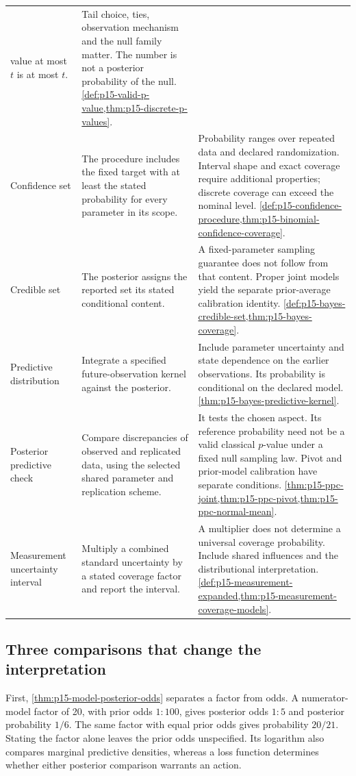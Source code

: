 \begin{longtable}{@{}p{}p{}p{}@{}}
value at most \(t\) is at most \(t\). & Tail choice, ties, observation
mechanism and the null family matter. The number is not a posterior
probability of the null. \cref{def:p15-valid-p-value,thm:p15-discrete-p-values}. \\
Confidence set & The procedure includes the fixed target with at least the
stated probability for every parameter in its scope. & Probability ranges
over repeated data and declared randomization. Interval shape and exact
coverage require additional properties; discrete coverage can exceed the
nominal level.
\cref{def:p15-confidence-procedure,thm:p15-binomial-confidence-coverage}. \\
Credible set & The posterior assigns the reported set its stated conditional
content. & A fixed-parameter sampling guarantee does not follow from that
content. Proper joint models yield the separate prior-average calibration
identity. \cref{def:p15-bayes-credible-set,thm:p15-bayes-coverage}. \\
Predictive distribution & Integrate a specified future-observation kernel
against the posterior. & Include parameter uncertainty and state dependence
on the earlier observations. Its probability is conditional on the declared
model. \cref{thm:p15-bayes-predictive-kernel}. \\
Posterior predictive check & Compare discrepancies of observed and replicated
data, using the selected shared parameter and replication scheme. & It tests
the chosen aspect. Its reference probability need not be a valid classical
\(p\)-value under a fixed null sampling law. Pivot and prior-model
calibration have separate conditions.
\cref{thm:p15-ppc-joint,thm:p15-ppc-pivot,thm:p15-ppc-normal-mean}. \\
Measurement uncertainty interval & Multiply a combined standard uncertainty
by a stated coverage factor and report the interval. & A multiplier does
not determine a universal coverage probability. Include shared influences
and the distributional interpretation.
\cref{def:p15-measurement-expanded,thm:p15-measurement-coverage-models}. \\
\bottomrule
\end{longtable}

\subsection{Three comparisons that change the interpretation}

First, \cref{thm:p15-model-posterior-odds} separates a factor from odds.
A numerator-model factor of 20, with prior odds \(1:100\), gives posterior
odds \(1:5\) and posterior probability \(1/6\). The same factor with
equal prior odds gives probability \(20/21\). Stating the factor alone
leaves the prior odds unspecified. Its logarithm also compares marginal
predictive densities, whereas a loss function determines whether either
posterior comparison warrants an action.

